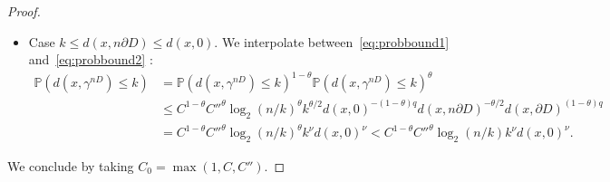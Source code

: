 \documentclass[11pt]{article}
\newtheorem{lemma}[theorem]{Lemma}
\begin{document}
\begin{proof}
\begin{itemize}
    \item Case $k\leq d(x,n \partial D)\leq d(x,0)$.
    We interpolate between~\eqref{eq:probbound1} and~\eqref{eq:probbound2} :
    \begin{align*}
    \mathbb{P}( d(x,\gamma^{nD})\leq k )
    &=\mathbb{P}( d(x,\gamma^{nD})\leq k )^{1-\theta}\mathbb{P}( d(x,\gamma^{nD})\leq k )^{\theta}\\
    &\leq C^{1-\theta} C''^\theta \log_2(n/k)^\theta
    k^{\theta/2} d(x,0)^{-(1-\theta) q} d(x, n \partial D)^{-\theta/2}   d(x,\partial D)^{(1-\theta) q} \\
    &=
    C^{1-\theta} C''^\theta \log_2(n/k)^\theta k^{\nu} d(x,0)^{\nu}<    C^{1-\theta} C''^\theta \log_2(n/k)k^{\nu} d(x,0)^{\nu}.
    \end{align*}
    \end{itemize}
    We conclude by taking $ C_0=\max( 1, C,C''  )$.
\end{proof}





\end{document}
